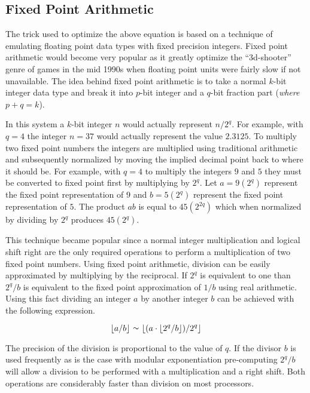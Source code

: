 \documentclass[b5paper]{book}
\def\approx{\raisebox{0.2ex}{\mbox{\small $\sim$}}}
\begin{document}
\subsection{Fixed Point Arithmetic}
The trick used to optimize the above equation is based on a technique of emulating floating point data types with fixed precision integers.  Fixed
point arithmetic would become very popular as it greatly optimize the ``3d-shooter'' genre of games in the mid 1990s when floating point units were 
fairly slow if not unavailable.   The idea behind fixed point arithmetic is to take a normal $k$-bit integer data type and break it into $p$-bit 
integer and a $q$-bit fraction part (\textit{where $p+q = k$}).  

In this system a $k$-bit integer $n$ would actually represent $n/2^q$.  For example, with $q = 4$ the integer $n = 37$ would actually represent the
value $2.3125$.  To multiply two fixed point numbers the integers are multiplied using traditional arithmetic and subsequently normalized by 
moving the implied decimal point back to where it should be.  For example, with $q = 4$ to multiply the integers $9$ and $5$ they must be converted 
to fixed point first by multiplying by $2^q$.  Let $a = 9(2^q)$ represent the fixed point representation of $9$ and $b = 5(2^q)$ represent the 
fixed point representation of $5$.  The product $ab$ is equal to $45(2^{2q})$ which when normalized by dividing by $2^q$ produces $45(2^q)$.  

This technique became popular since a normal integer multiplication and logical shift right are the only required operations to perform a multiplication
of two fixed point numbers.  Using fixed point arithmetic, division can be easily approximated by multiplying by the reciprocal.  If $2^q$ is 
equivalent to one than $2^q/b$ is equivalent to the fixed point approximation of $1/b$ using real arithmetic.  Using this fact dividing an integer 
$a$ by another integer $b$ can be achieved with the following expression.

\begin{equation}
\lfloor a / b \rfloor \mbox{ }\approx\mbox{ } \lfloor (a \cdot \lfloor 2^q / b \rfloor)/2^q \rfloor
\end{equation}

The precision of the division is proportional to the value of $q$.  If the divisor $b$ is used frequently as is the case with 
modular exponentiation pre-computing $2^q/b$ will allow a division to be performed with a multiplication and a right shift.  Both operations
are considerably faster than division on most processors.  
\end{document}
